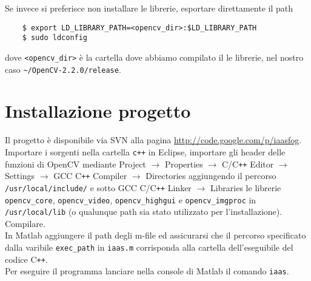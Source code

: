 \documentclass[12pt]{report}
\begin{document}
\noindent Se invece si preferisce non installare le librerie, esportare direttamente il path 

\begin{verbatim}
	$ export LD_LIBRARY_PATH=<opencv_dir>:$LD_LIBRARY_PATH
	$ sudo ldconfig
\end{verbatim}

\noindent dove \verb|<opencv_dir>| \`e la cartella dove abbiamo compilato il le librerie, nel nostro caso \verb|~/OpenCV-2.2.0/release|.

\section{Installazione progetto}
\noindent Il progetto \`e disponibile via SVN alla pagina \url{http://code.google.com/p/iaasfog}.\\
Importare i sorgenti nella cartella \verb|c++| in Eclipse, importare gli header delle funzioni di OpenCV mediante Project $\rightarrow$ Properties  $\rightarrow$ C\slash C\verb|++| Editor $\rightarrow$ Settings $\rightarrow$ GCC C\verb|++| Compiler $\rightarrow$ Directories aggiungendo il percorso \verb|/usr/local/include/| e sotto GCC C\slash C\verb|++| Linker $\rightarrow$ Libraries le librerie \verb|opencv_core|, \verb|opencv_video|, \verb|opencv_highgui| e \verb|opencv_imgproc| in \verb|/usr/local/lib| (o qualunque path sia stato utilizzato per l'installazione).\\
Compilare.\\

\noindent In Matlab aggiungere il path degli m-file ed assicurarsi che il percorso specificato dalla varibile \verb|exec_path| in \verb|iaas.m| corrisponda alla cartella dell'eseguibile del codice C\verb|++|.\\
Per eseguire il programma lanciare nella console di Matlab il comando \verb|iaas|.

\printbibliography
\end{document}
